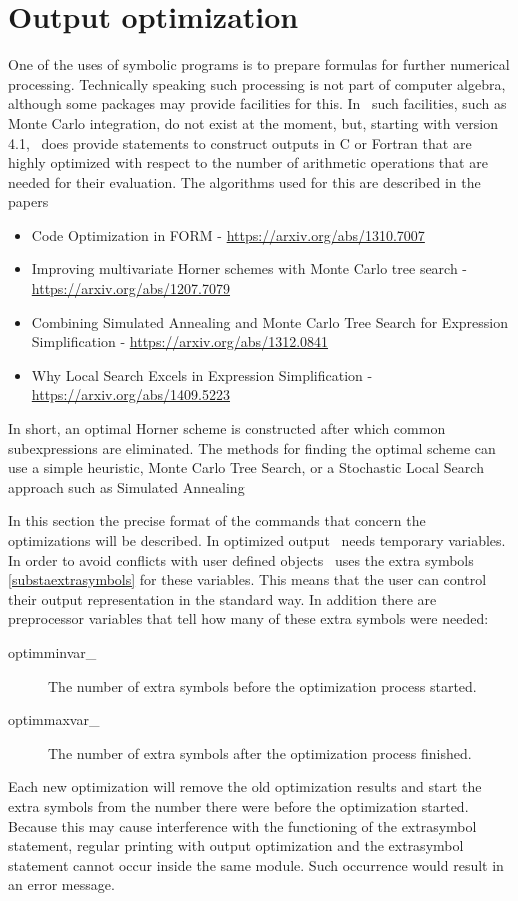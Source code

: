 
\chapter{Output optimization}
\label{optimization}

One of the uses of symbolic programs is to prepare formulas for further 
numerical processing. Technically speaking such 
processing is not part of computer algebra, although some packages may 
provide facilities for this. In \FORM\ such facilities, such as
Monte Carlo integration, do not exist at the moment, but, starting with 
version 4.1, \FORM\ does provide statements to construct outputs in C or 
Fortran that are highly optimized with respect to the number of arithmetic 
operations that are needed for their 
evaluation. The algorithms used for this are described in the papers
\begin{itemize}
  \item Code Optimization in FORM - \url{https://arxiv.org/abs/1310.7007}
  \item Improving multivariate Horner schemes with Monte Carlo tree search - \url{https://arxiv.org/abs/1207.7079}
  \item Combining Simulated Annealing and Monte Carlo Tree Search for Expression Simplification - \url{https://arxiv.org/abs/1312.0841}
  \item Why Local Search Excels in Expression Simplification - \url{https://arxiv.org/abs/1409.5223}
\end{itemize}
In short, an optimal Horner scheme is constructed after
which common subexpressions are eliminated. The methods for finding the
optimal scheme can use a simple heuristic, Monte Carlo Tree Search,
or a Stochastic Local Search approach such as Simulated Annealing

In this section the precise 
format of the commands that concern the optimizations will be described.
In optimized output \FORM\ needs temporary variables. In order to avoid conflicts with user defined objects \FORM\ 
uses the extra symbols \ref{substaextrasymbols} for 
these variables. This means that the user can control their output 
representation in the standard way. In addition there are preprocessor 
variables that tell how many of these extra symbols were needed:
\begin{description}
\item[optimminvar\_] The number of extra symbols before the optimization 
process started\index{optimminvar\_}.
\item[optimmaxvar\_] The number of extra symbols after the optimization 
process finished\index{optimmaxvar\_}.
\end{description}
Each new optimization will remove the old optimization results and start 
the extra symbols from the number there were before the optimization 
started. Because this may cause interference with the functioning of the 
extrasymbol statement, regular printing with output optimization and the 
extrasymbol statement cannot occur inside the same module. Such occurrence 
would result in an error message.

